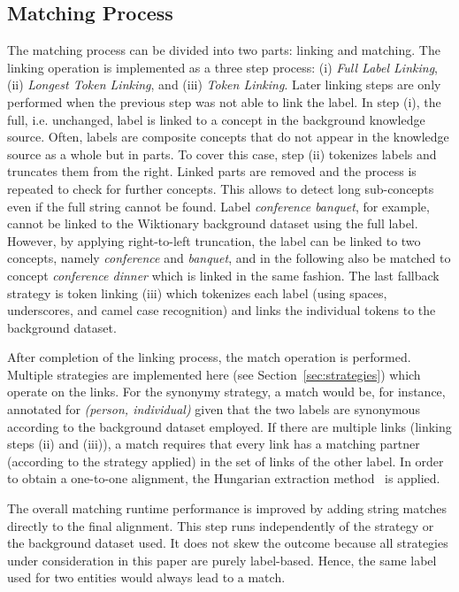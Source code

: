 \documentclass[runningheads]{llncs}
\begin{document}
\subsection{Matching Process}
\label{sec:matcher}
The matching process can be divided into two parts: linking and matching. The linking operation is implemented as a three step process: (i) \textit{Full Label Linking}, (ii) \textit{Longest Token Linking}, and (iii) \textit{Token Linking}. Later linking steps are only performed when the previous step was not able to link the label. In step (i), the full, i.e. unchanged, label is linked to a concept in the background knowledge source. 
Often, labels are composite concepts that do not appear in the knowledge source as a whole but in parts. To cover this case, step (ii) tokenizes labels and truncates them from the right. Linked parts are removed and the process is repeated to check for further concepts. This allows to detect long sub-concepts even if the full string cannot be found. Label \textit{conference banquet}, for example, cannot be linked to the Wiktionary background dataset using the full label. However, by applying right-to-left truncation, the label can be linked to two concepts, namely \textit{conference} and \textit{banquet}, and in the following also be matched to concept \textit{conference dinner} which is linked in the same fashion. The last fallback strategy is token linking (iii) which tokenizes each label (using spaces, underscores, and camel case recognition) and links the individual tokens to the background dataset.

After completion of the linking process, the match operation is performed. Multiple strategies are implemented here (see Section~\ref{sec:strategies}) which operate on the links. For the synonymy strategy, a match would be, for instance, annotated for \textit{(person, individual)} given that the two labels are synonymous according to the background dataset employed. If there are multiple links (linking steps (ii) and (iii)), a match requires that every link  has a matching partner (according to the strategy applied) in the set of links of the other label. In order to obtain a one-to-one alignment, the Hungarian extraction method~\cite{kuhn1955hungarian} is applied.

The overall matching runtime performance is improved by adding string matches directly to the final alignment. This step runs independently of the strategy or the background dataset used. It does not skew the outcome because all strategies under consideration in this paper are purely label-based. Hence, the same label used for two entities would always lead to a match. 
\end{document}
